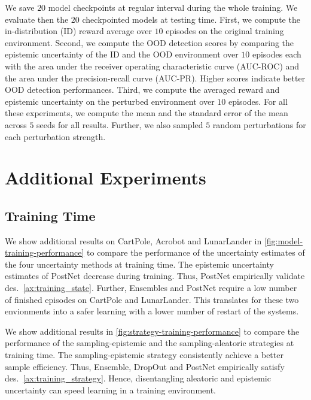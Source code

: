 We save $20$ model checkpoints at regular interval during the whole training. We evaluate then the $20$ checkpointed models at testing time. First, we compute the in-distribution (ID) reward average over $10$ episodes on the original training environment. Second, we compute the OOD detection scores by comparing the epistemic uncertainty of the ID and the OOD environment over $10$ episodes each with the area under the receiver operating characteristic curve (AUC-ROC) and the area under the precision-recall curve (AUC-PR). Higher scores indicate better OOD detection performances. Third, we compute the averaged reward and epistemic uncertainty on the perturbed environment over $10$ episodes. For all these experiments, we compute the mean and the standard error of the mean across $5$ seeds for all results. Further, we also sampled $5$ random perturbations for each perturbation strength.

\section{Additional Experiments}
\label{app:additional-experiments}

\subsection{Training Time}

We show additional results on CartPole, Acrobot and LunarLander in \cref{fig:model-training-performance} to compare the performance of the uncertainty estimates of the four uncertainty methods at training time. The epistemic uncertainty estimates of PostNet decrease during training. Thus, PostNet empirically validate des.~\ref{ax:training_state}. Further, Ensembles and PostNet require a low number of finished episodes on CartPole and LunarLander. This translates for these two envionments into a safer learning with a lower number of restart of the systems.


%
%
%

We show additional results in \cref{fig:strategy-training-performance} to compare the performance of the sampling-epistemic and the sampling-aleatoric strategies at training time. The sampling-epistemic strategy consistently achieve a better sample efficiency. Thus, Ensemble, DropOut and PostNet empirically satisfy des.~\ref{ax:training_strategy}. Hence, disentangling aleatoric and epistemic uncertainty can speed learning in a training environment.

